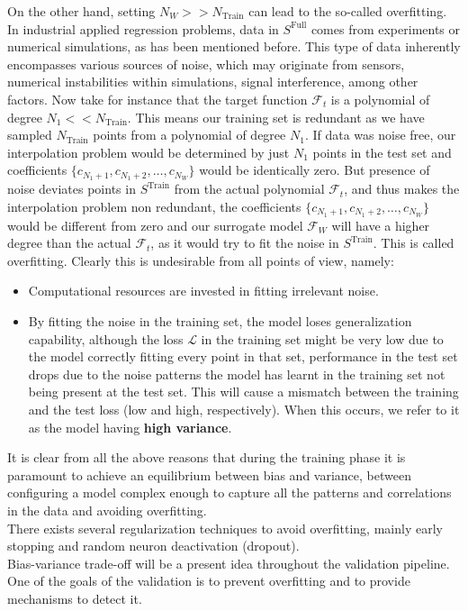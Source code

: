 \indent On the other hand, setting $N_W>>N_{\text{Train}}$ can lead to the so-called overfitting. In industrial applied regression problems, data in $S^\text{Full}$ comes from experiments or numerical simulations, as has been mentioned before. This type of data inherently encompasses various sources of noise, which may originate from sensors, numerical instabilities within simulations, signal interference, among other factors. Now take for instance that the target function $\mathcal{F}_t$ is a polynomial of degree $N_1<<N_{\text{Train}}$. This means our training set is redundant as we have sampled $N_\text{Train}$ points from a polynomial of degree $N_1$. If data was noise free, our interpolation problem would be determined by just $N_1$ points in the test set and coefficients $\{c_{N_1+1},c_{N_1+2},\ldots,c_{N_W}\}$ would be identically zero. But presence of noise deviates points in $S^\text{Train}$ from the actual polynomial $\mathcal{F}_t$, and thus makes the interpolation problem non redundant, \ie the coefficients $\{c_{N_1+1},c_{N_1+2},\ldots,c_{N_W}\}$ would be different from zero and our surrogate model $\mathcal{{F}}_W$ will have a higher degree than the actual $\mathcal{F}_t$, as it would try to fit the noise in $S^\text{Train}$. This is called overfitting. Clearly this is undesirable from all points of view, namely:
\begin{itemize}
	\item Computational resources are invested in fitting irrelevant noise.
	\item By fitting the noise in the training set, the model loses generalization capability, \ie although the loss $\mathcal{L}$ in the training set might be very low due to the model correctly fitting every point in that set, performance in the test set drops due to the noise patterns the model has learnt in the training set not being present at the test set. This will cause a mismatch between the training and the test loss (low and high, respectively). When this occurs, we refer to it as the model having \textbf{high variance}.
\end{itemize}

It is clear from all the above reasons that during the training phase it is paramount to achieve an equilibrium between bias and variance, \ie between configuring a model complex enough to capture all the patterns and correlations in the data and avoiding overfitting.\\
%
\indent There exists several regularization techniques to avoid overfitting, mainly early stopping and random neuron deactivation (dropout)\cite{Marsland2015Machine}.\\
%
\indent Bias-variance trade-off will be a present idea throughout the validation pipeline. One of the goals of the validation is to prevent overfitting and to provide mechanisms to detect it.

